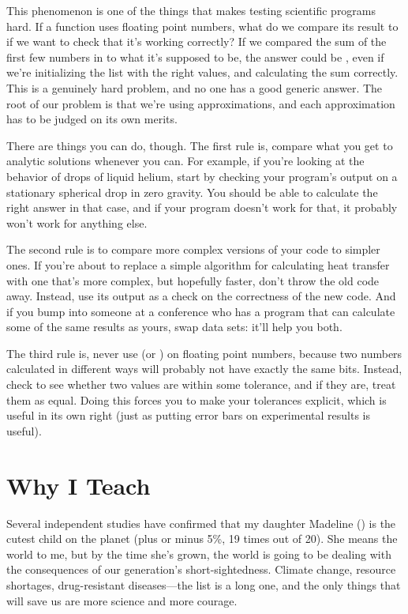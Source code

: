 This phenomenon is one of the things that makes testing scientific
programs hard. If a function uses floating point numbers, what do we
compare its result to if we want to check that it's working correctly?
If we compared the sum of the first few numbers in  to what
it's supposed to be, the answer could be , even if we're
initializing the list with the right values, and calculating the sum
correctly. This is a genuinely hard problem, and no one has a good
generic answer. The root of our problem is that we're using
approximations, and each approximation has to be judged on its own
merits.

There are things you can do, though. The first rule is, compare what you
get to analytic solutions whenever you can. For example, if you're
looking at the behavior of drops of liquid helium, start by checking
your program's output on a stationary spherical drop in zero gravity.
You should be able to calculate the right answer in that case, and if
your program doesn't work for that, it probably won't work for anything
else.

The second rule is to compare more complex versions of your code to
simpler ones. If you're about to replace a simple algorithm for
calculating heat transfer with one that's more complex, but hopefully
faster, don't throw the old code away. Instead, use its output as a
check on the correctness of the new code. And if you bump into someone
at a conference who has a program that can calculate some of the same
results as yours, swap data sets: it'll help you both.

The third rule is, never use \code{==} (or \code{!=}) on floating
point numbers, because two numbers calculated in different ways will
probably not have exactly the same bits. Instead, check to see whether
two values are within some tolerance, and if they are, treat them as
equal. Doing this forces you to make your tolerances explicit, which is
useful in its own right (just as putting error bars on experimental
results is useful).

\section{Why I Teach}


Several independent studies have confirmed that my daughter Madeline
() is the cutest child on the planet (plus or
minus 5\%, 19 times out of 20). She means the world to me, but by the
time she's grown, the world is going to be dealing with the
consequences of our generation's short-sightedness.  Climate change,
resource shortages, drug-resistant diseases---the list is a long one,
and the only things that will save us are more science and more
courage.

